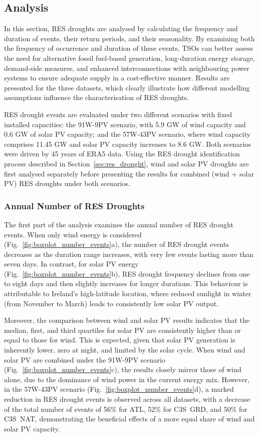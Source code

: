 \documentclass[preprint, 12pt]{elsarticle}
\begin{document}
\subsection{Analysis}
\label{sec:analysis}

In this section, RES droughts are analysed by calculating the frequency and duration of events, their return periods, and their seasonality. By examining both the frequency of occurrence and duration of these events, TSOs can better assess the need for alternative fossil fuel-based generation, long-duration energy storage, demand-side measures, and enhanced interconnections with neighbouring power systems to ensure adequate supply in a cost-effective manner. Results are presented for the three datasets, which clearly illustrate how different modelling assumptions influence the characterisation of RES droughts.

RES drought events are evaluated under two different scenarios with fixed installed capacities: the 91W-9PV scenario, with 5.9 GW of wind capacity and 0.6 GW of solar PV capacity; and the 57W-43PV scenario, where wind capacity comprises 11.45 GW and solar PV capacity increases to 8.6 GW. Both scenarios were driven by 45 years of ERA5 data. Using the RES drought identification process described in Section~\ref{sec:res_drought}, wind and solar PV droughts are first analysed separately before presenting the results for combined (wind + solar PV) RES droughts under both scenarios.

\subsubsection{Annual Number of RES Droughts}

The first part of the analysis examines the annual number of RES drought events. When only wind energy is considered (Fig.~\ref{fig:boxplot_number_events}a), the number of RES drought events decreases as the duration range increases, with very few events lasting more than seven days. In contrast, for solar PV energy (Fig.~\ref{fig:boxplot_number_events}b), RES drought frequency declines from one to eight days and then slightly increases for longer durations. This behaviour is attributable to Ireland's high-latitude location, where reduced sunlight in winter (from November to March) leads to consistently low solar PV output.

Moreover, the comparison between wind and solar PV results indicates that the median, first, and third quartiles for solar PV are consistently higher than or equal to those for wind. This is expected, given that solar PV generation is inherently lower, zero at night, and limited by the solar cycle. When wind and solar PV are combined under the 91W-9PV scenario (Fig.~\ref{fig:boxplot_number_events}c), the results closely mirror those of wind alone, due to the dominance of wind power in the current energy mix. However, in the 57W-43PV scenario (Fig.~\ref{fig:boxplot_number_events}d), a marked reduction in RES drought events is observed across all datasets, with a decrease of the total number of events of 56\% for ATL, 52\% for C3S~GRD, and 50\% for C3S~NAT, demonstrating the beneficial effects of a more equal share of wind and solar PV capacity.
\end{document}
